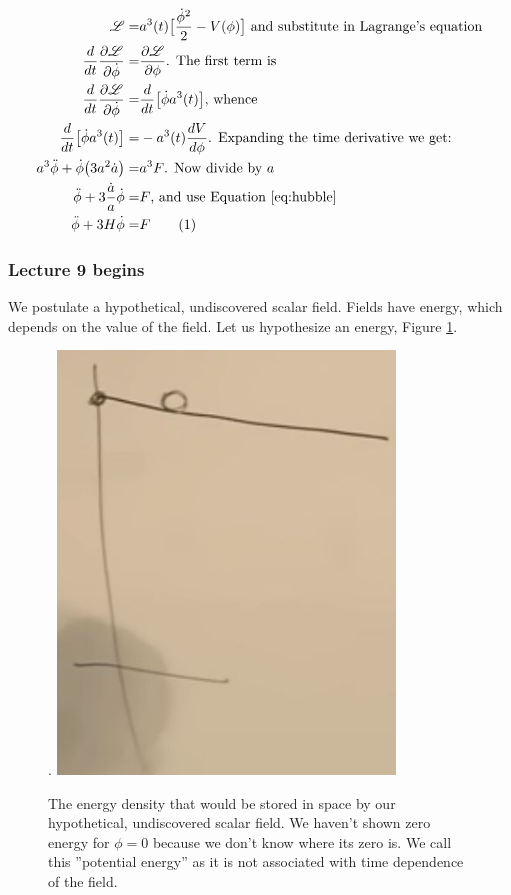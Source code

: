 \documentclass[]{article}
\newcommand\numberthis{\addtocounter{equation}{1}\tag{\theequation}}
\newcommand{\Lagr}{\mathscr{L}}
\begin{document}
\begin{align*}
	\Lagr =&  a^3(t)\big[\frac{\dot{\phi}^2}{2} - V(\phi)\big] \text{ and substitute in Lagrange's equation}\\
	\frac{d}{dt} \frac{\partial \Lagr}{\partial \dot{\phi}}=& \frac{\partial \Lagr}{\partial \phi} \text{. The first term is}\\
	\frac{d}{dt} \frac{\partial \Lagr}{\partial \dot{\phi}}=&\frac{d}{dt}\big[\dot{\phi}a^3(t)\big]	\text{, whence}\\
	\frac{d}{dt}\big[\dot{\phi}a^3(t)\big]=&-a^3(t)\frac{dV}{d\phi} \text{. Expanding the time derivative we get:}\\
	a^3\ddot{\phi} + \dot{\phi}\big(3a^2\dot{a}\big)=&a^3F \text {. Now divide by $a$}\\
	\ddot{\phi} + 3\frac{\dot{a}}{a}\dot{\phi}=&F\text{, and use Equation \eqref{eq:hubble}}\\
	\ddot{\phi} + 3H\dot{\phi}=&F \numberthis \label{eq:falling:rock:viscous}
\end{align*}

\subsubsection{Lecture 9 begins}

We postulate a hypothetical, undiscovered scalar field. Fields have energy, which depends on the value of the field. Let us hypothesize an energy, Figure \ref{fig:cosmo-9-scalar-field}.
\begin{figure}[H]
	\caption[Hypothetical, undiscovered scalar field]{The energy density that would be stored in space by our hypothetical, undiscovered scalar field. We haven't shown zero energy for $\phi=0$ because we don't know where its zero is. We call this ''potential energy'' as it is not associated with time dependence of the field.}\label{fig:cosmo-9-scalar-field}.
	\includegraphics[width=0.8\textwidth]{cosmo-9-scalar-field}
\end{figure}
\end{document}
